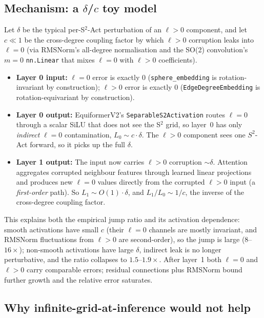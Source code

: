 \documentclass{article}
\begin{document}
\subsection{Mechanism: a $\delta$/$c$ toy model}

Let $\delta$ be the typical per-S$^2$-Act perturbation of an
$\ell{>}0$ component, and let $c \ll 1$ be the cross-degree coupling
factor by which $\ell{>}0$ corruption leaks into $\ell{=}0$ (via
RMSNorm's all-degree normalisation and the SO(2) convolution's
$m{=}0$ \texttt{nn.Linear} that mixes $\ell{=}0$ with $\ell{>}0$
coefficients).
\begin{itemize}\setlength\itemsep{0pt}
\item \textbf{Layer 0 input:} $\ell{=}0$ error is exactly 0 (\texttt{sphere\_embedding} is rotation-invariant by construction); $\ell{>}0$ error is exactly 0 (\texttt{EdgeDegreeEmbedding} is rotation-equivariant by construction).
\item \textbf{Layer 0 output:} EquiformerV2's
  \texttt{SeparableS2Activation} routes $\ell{=}0$ through a scalar
  SiLU that does not see the S$^2$ grid, so layer~0 has only
  \emph{indirect} $\ell{=}0$ contamination,
  $L_0 \sim c \cdot \delta$. The $\ell{>}0$ component sees one
  $S^2$-Act forward, so it picks up the full $\delta$.
\item \textbf{Layer 1 output:} The input now carries $\ell{>}0$
  corruption $\sim \delta$. Attention aggregates corrupted neighbour
  features through learned linear projections and produces new
  $\ell{=}0$ values directly from the corrupted $\ell{>}0$ input
  (a \emph{first-order} path). So $L_1 \sim O(1) \cdot \delta$, and
  $L_1/L_0 \sim 1/c$, the inverse of the cross-degree coupling
  factor.
\end{itemize}
This explains both the empirical jump ratio and its activation
dependence: smooth activations have small $c$ (their $\ell{=}0$
channels are mostly invariant, and RMSNorm fluctuations from
$\ell{>}0$ are second-order), so the jump is large
($8$--$16\times$); non-smooth activations have large $\delta$,
indirect leak is no longer perturbative, and the ratio collapses to
$1.5$--$1.9\times$. After layer~1 both $\ell{=}0$ and $\ell{>}0$
carry comparable errors; residual connections plus RMSNorm bound
further growth and the relative error saturates.

\subsection{Why infinite-grid-at-inference would not help}
\end{document}
